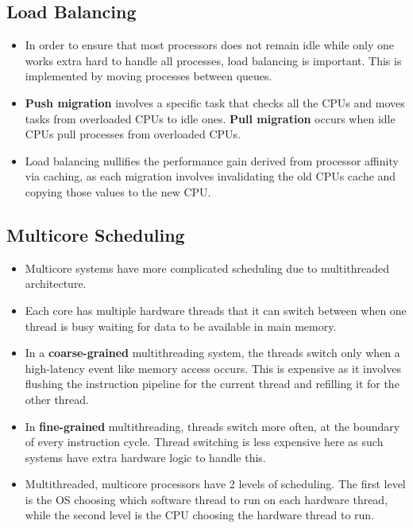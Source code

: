 \documentclass{article}
\theoremstyle{plain}
\theoremstyle{definition}
\begin{document}
\subsection{Load Balancing}
\begin{itemize}
    \item In order to ensure that most processors does not remain idle while only one works extra hard to handle all processes, load balancing is important. This is implemented by moving processes between queues. 
    
    \item \textbf{Push migration} involves a specific task that checks all the CPUs and moves tasks from overloaded CPUs to idle ones. \textbf{Pull migration} occurs when idle CPUs pull processes from overloaded CPUs. 
    
    \item Load balancing nullifies the performance gain derived from processor affinity via caching, as each migration involves invalidating the old CPUs cache and copying those values to the new CPU. 
\end{itemize}

\subsection{Multicore Scheduling}
\begin{itemize}
    \item Multicore systems have more complicated scheduling due to multithreaded architecture. 
    
    \item Each core has multiple hardware threads that it can switch between when one thread is busy waiting for data to be available in main memory.
    
    \item In a \textbf{coarse-grained} multithreading system, the threads switch only when a high-latency event like memory access occurs. This is expensive as it involves flushing the instruction pipeline for the current thread and refilling it for the other thread. 
    
    \item In \textbf{fine-grained} multithreading, threads switch more often, at the boundary of every instruction cycle. Thread switching is less expensive here as such systems have extra hardware logic to handle this.
    
    \item Multithreaded, multicore processors have 2 levels of scheduling. The first level is the OS choosing which software thread to run on each hardware thread, while the second level is the CPU choosing the hardware thread to run. 
\end{itemize}
\end{document}
